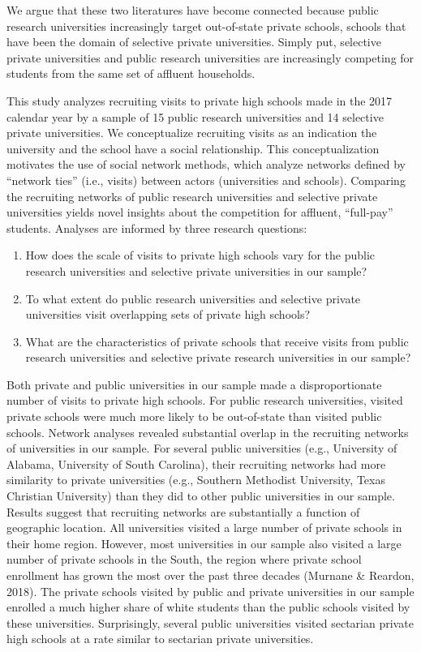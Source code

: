 \documentclass[
  12pt,
]{article}
\providecommand{\tightlist}{%
  \setlength{\itemsep}{0pt}\setlength{\parskip}{0pt}}
\begin{document}
We argue that these two literatures have become connected because public research universities increasingly target out-of-state private schools, schools that have been the domain of selective private universities. Simply put, selective private universities and public research universities are increasingly competing for students from the same set of affluent households.

This study analyzes recruiting visits to private high schools made in the 2017 calendar year by a sample of 15 public research universities and 14 selective private universities. We conceptualize recruiting visits as an indication the university and the school have a social relationship. This conceptualization motivates the use of social network methods, which analyze networks defined by ``network ties'' (i.e., visits) between actors (universities and schools). Comparing the recruiting networks of public research universities and selective private universities yields novel insights about the competition for affluent, ``full-pay'' students. Analyses are informed by three research questions:

\begin{enumerate}
\def\labelenumi{\arabic{enumi}.}
\tightlist
\item
  How does the scale of visits to private high schools vary for the public research universities and selective private universities in our sample?
\item
  To what extent do public research universities and selective private universities visit overlapping sets of private high schools?
\item
  What are the characteristics of private schools that receive visits from public research universities and selective private research universities in our sample?
\end{enumerate}

Both private and public universities in our sample made a disproportionate number of visits to private high schools. For public research universities, visited private schools were much more likely to be out-of-state than visited public schools. Network analyses revealed substantial overlap in the recruiting networks of universities in our sample. For several public universities (e.g., University of Alabama, University of South Carolina), their recruiting networks had more similarity to private universities (e.g., Southern Methodist University, Texas Christian University) than they did to other public universities in our sample. Results suggest that recruiting networks are substantially a function of geographic location. All universities visited a large number of private schools in their home region. However, most universities in our sample also visited a large number of private schools in the South, the region where private school enrollment has grown the most over the past three decades (Murnane \& Reardon, 2018). The private schools visited by public and private universities in our sample enrolled a much higher share of white students than the public schools visited by these universities. Surprisingly, several public universities visited sectarian private high schools at a rate similar to sectarian private universities.
\end{document}
